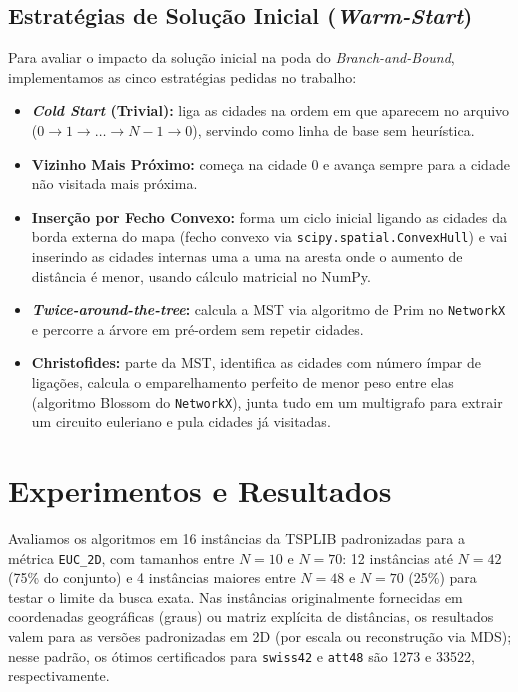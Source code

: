 \documentclass[12pt]{article}
\begin{document}
\subsection{Estratégias de Solução Inicial (\textit{Warm-Start})}

Para avaliar o impacto da solução inicial na poda do \textit{Branch-and-Bound}, implementamos as cinco estratégias pedidas no trabalho:
\begin{itemize}
  \item \textbf{\textit{Cold Start} (Trivial):} liga as cidades na ordem em que aparecem no arquivo ($0 \to 1 \to \dots \to N-1 \to 0$), servindo como linha de base sem heurística.
  \item \textbf{Vizinho Mais Próximo:} começa na cidade 0 e avança sempre para a cidade não visitada mais próxima.
  \item \textbf{Inserção por Fecho Convexo:} forma um ciclo inicial ligando as cidades da borda externa do mapa (fecho convexo via \texttt{scipy.spatial.ConvexHull}) e vai inserindo as cidades internas uma a uma na aresta onde o aumento de distância é menor, usando cálculo matricial no NumPy.
  \item \textbf{\textit{Twice-around-the-tree}:} calcula a MST via algoritmo de Prim no \texttt{NetworkX} e percorre a árvore em pré-ordem sem repetir cidades.
  \item \textbf{Christofides:} parte da MST, identifica as cidades com número ímpar de ligações, calcula o emparelhamento perfeito de menor peso entre elas (algoritmo Blossom do \texttt{NetworkX}), junta tudo em um multigrafo para extrair um circuito euleriano e pula cidades já visitadas.
\end{itemize}

\section{Experimentos e Resultados}

Avaliamos os algoritmos em 16 instâncias da TSPLIB padronizadas para a métrica \texttt{EUC\_2D}, com tamanhos entre $N = 10$ e $N = 70$: 12 instâncias até $N = 42$ (75\% do conjunto) e 4 instâncias maiores entre $N = 48$ e $N = 70$ (25\%) para testar o limite da busca exata. Nas instâncias originalmente fornecidas em coordenadas geográficas (graus) ou matriz explícita de distâncias, os resultados valem para as versões padronizadas em 2D (por escala ou reconstrução via MDS); nesse padrão, os ótimos certificados para \texttt{swiss42} e \texttt{att48} são 1273 e 33522, respectivamente.
\end{document}

